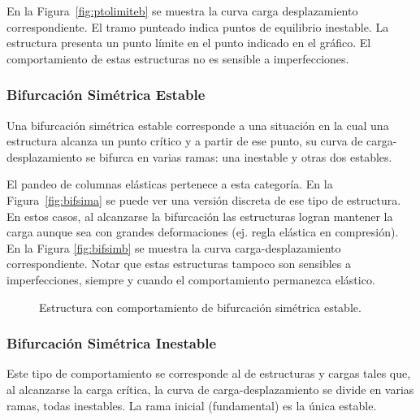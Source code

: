 En la Figura~\ref{fig:ptolimiteb} se muestra la curva carga desplazamiento correspondiente. %
%
El tramo punteado indica puntos de equilibrio inestable.  %
%
La estructura presenta un punto límite en el punto indicado en el gráfico. %
%
El comportamiento de estas estructuras no es sensible a imperfecciones.
%

\subsubsection{Bifurcación Simétrica Estable}

Una bifurcación simétrica estable corresponde a una situación en la cual una estructura alcanza un punto crítico y a partir de ese punto, su curva de carga-desplazamiento se bifurca en varias ramas: una inestable y otras dos estables. %

El pandeo de columnas elásticas pertenece a esta categoría. %
%
En la Figura~\ref{fig:bifsima} se puede ver una versión discreta de ese tipo de estructura. En estos casos, al alcanzarse la bifurcación las estructuras logran mantener la carga aunque sea con grandes deformaciones (ej. regla elástica en compresión). %
%
En la Figura \ref{fig:bifsimb} se muestra la curva carga-desplazamiento correspondiente. %
%
Notar que estas estructuras tampoco son sensibles a imperfecciones, siempre y cuando el comportamiento permanezca elástico.

\begin{figure}[htb]
	\centering
\hspace{0.05\textwidth}
	\caption{Estructura con comportamiento de bifurcación simétrica estable.}
	\label{fig:fig10}
\end{figure}



\subsubsection{Bifurcación Simétrica Inestable}

Este tipo de comportamiento se corresponde al de estructuras y cargas tales que, al alcanzarse la carga crítica, la curva de carga-desplazamiento se divide en varias ramas, todas inestables. %
%
La rama inicial (fundamental) es la única estable. %

